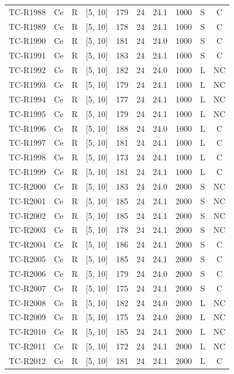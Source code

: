 \begin{longtable}{lccccccccc}
TC-R1988 & Ce & R & [5, 10] & 179 & 24 & 24.1 & 1000 & S & C \\
TC-R1989 & Ce & R & [5, 10] & 178 & 24 & 24.1 & 1000 & S & C \\
TC-R1990 & Ce & R & [5, 10] & 181 & 24 & 24.0 & 1000 & S & C \\
TC-R1991 & Ce & R & [5, 10] & 183 & 24 & 24.1 & 1000 & S & C \\
TC-R1992 & Ce & R & [5, 10] & 182 & 24 & 24.0 & 1000 & L & NC \\
TC-R1993 & Ce & R & [5, 10] & 179 & 24 & 24.1 & 1000 & L & NC \\
TC-R1994 & Ce & R & [5, 10] & 177 & 24 & 24.1 & 1000 & L & NC \\
TC-R1995 & Ce & R & [5, 10] & 179 & 24 & 24.1 & 1000 & L & NC \\
TC-R1996 & Ce & R & [5, 10] & 188 & 24 & 24.0 & 1000 & L & C \\
TC-R1997 & Ce & R & [5, 10] & 181 & 24 & 24.1 & 1000 & L & C \\
TC-R1998 & Ce & R & [5, 10] & 173 & 24 & 24.1 & 1000 & L & C \\
TC-R1999 & Ce & R & [5, 10] & 181 & 24 & 24.1 & 1000 & L & C \\
TC-R2000 & Ce & R & [5, 10] & 183 & 24 & 24.0 & 2000 & S & NC \\
TC-R2001 & Ce & R & [5, 10] & 185 & 24 & 24.1 & 2000 & S & NC \\
TC-R2002 & Ce & R & [5, 10] & 185 & 24 & 24.1 & 2000 & S & NC \\
TC-R2003 & Ce & R & [5, 10] & 178 & 24 & 24.1 & 2000 & S & NC \\
TC-R2004 & Ce & R & [5, 10] & 186 & 24 & 24.1 & 2000 & S & C \\
TC-R2005 & Ce & R & [5, 10] & 185 & 24 & 24.1 & 2000 & S & C \\
TC-R2006 & Ce & R & [5, 10] & 179 & 24 & 24.0 & 2000 & S & C \\
TC-R2007 & Ce & R & [5, 10] & 175 & 24 & 24.1 & 2000 & S & C \\
TC-R2008 & Ce & R & [5, 10] & 182 & 24 & 24.0 & 2000 & L & NC \\
TC-R2009 & Ce & R & [5, 10] & 175 & 24 & 24.0 & 2000 & L & NC \\
TC-R2010 & Ce & R & [5, 10] & 185 & 24 & 24.1 & 2000 & L & NC \\
TC-R2011 & Ce & R & [5, 10] & 172 & 24 & 24.1 & 2000 & L & NC \\
TC-R2012 & Ce & R & [5, 10] & 181 & 24 & 24.1 & 2000 & L & C \\

\end{longtable}
